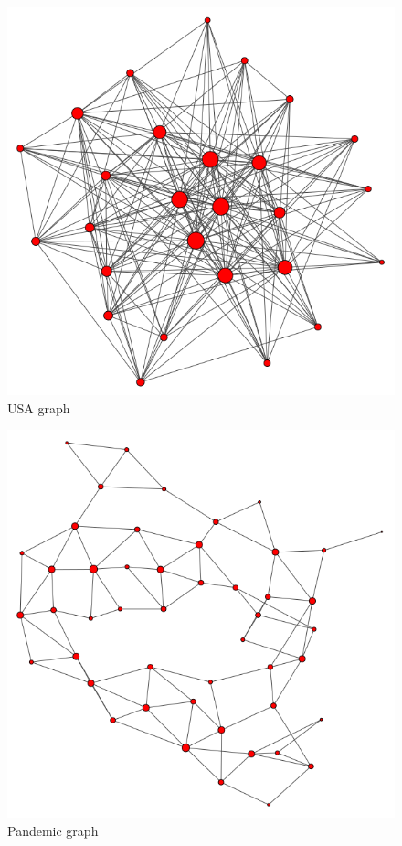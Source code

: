 \documentclass[11pt]{article}
\theoremstyle{definition}
\begin{document}
\begin{appendices}
\begin{figure}[h!]
  \centering
    \includegraphics[width=1\textwidth]{visualisations/USA_visual}
  \caption{USA graph}
  \label{fig:USA}
\end{figure}


\begin{figure}[h!]
  \centering
    \includegraphics[width=1\textwidth]{visualisations/pandemic_visual}
  \caption{Pandemic graph}
  \label{fig:pandemic}
\end{figure}


\end{appendices}
\end{document}
